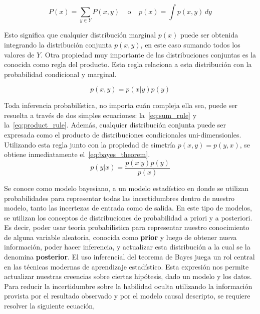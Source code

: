 \documentclass[11pt,twoside,spanish]{report} %
\begin{document}
\begin{equation} \label{eq:sum_rule}
\tag{regla de la suma}
P(x) = \sum_{y \in Y} P(x,y) \ \ \ \ \ \text{o} \ \ \ \ \ p(x) = \int p(x,y) \, dy
\end{equation}

Esto significa que cualquier distribuci\'on marginal $p(x)$ puede ser obtenida integrando la distribuci\'on conjunta $p(x,y)$, en este caso sumando todos los valores de $Y$.
Otra propiedad muy importante de las distribuciones conjuntas es la conocida como regla del producto.
Esta regla relaciona a esta distribuci\'on con la probabilidad condicional y marginal.

\begin{equation}\label{eq:product_rule}
\tag{regla del producto}
p(x,y) = p(x|y) p(y)
\end{equation}

Toda inferencia probabil\'istica, no importa cu\'an compleja ella sea, puede ser resuelta a trav\'es de dos simples ecuaciones: la~\ref{eq:sum_rule} y la~\ref{eq:product_rule}.
Adem\'as, cualquier distribuci\'on conjunta puede ser expresada como el producto de distribuciones condicionales uni-dimensionles.
Utilizando esta regla junto con la propiedad de simetr\'ia $p(x,y) = p(y,x)$, se obtiene inmediatamente el~\ref{eq:bayes_theorem}.
%
\begin{equation}\label{eq:bayes_theorem}
\tag{teorema de Bayes}
p(y|x) = \frac{p(x|y)p(y)}{p(x)}
\end{equation}
%

Se conoce como modelo bayesiano, a un modelo estad\'istico en donde se utilizan probabilidades para representar todas las incertidumbres dentro de nuestro modelo, tanto las incertezas de entrada como de salida.
En este tipo de modelos, se utilizan los conceptos de distribuciones de probabilidad a priori y a posteriori.
Es decir, poder usar teor\'ia probabil\'istica para representar nuestro conocimiento de alguna variable aleatoria, conocida como \textbf{prior} y luego de obtener nueva informaci\'on, poder hacer inferencia, y actualizar esta distribuci\'on a la cual se la denomina \textbf{posterior}.
El uso inferencial del teorema de Bayes juega un rol central en las t\'ecnicas modernas de aprendizaje estad\'istico.
Esta expresi\'on nos permite actualizar nuestras creencias sobre ciertas hip\'otesis, dado un modelo y los datos.
Para reducir la incertidumbre sobre la habilidad oculta utilizando la informaci\'on provista por el resultado observado y por el modelo causal descripto, se requiere resolver la siguiente ecuaci\'on,
\end{document}
